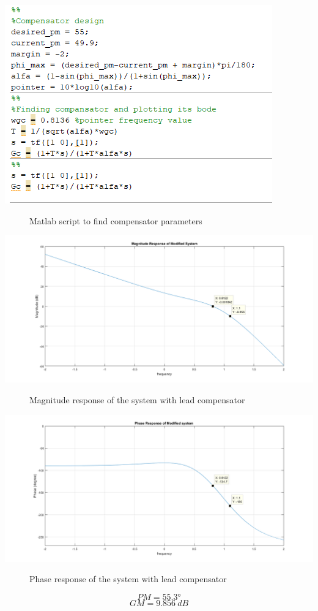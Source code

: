 \documentclass[11pt]{report}
\begin{document}
\includegraphics[scale=0.70, center]{code}
\begin{figure}[H]
\caption{Matlab script to find compensator parameters}
\label{fig:zero}
\end{figure}

\includegraphics[scale=0.40, center]{modified_magnitude}
\begin{figure}[H]
\caption{Magnitude response of the system with lead compensator}
\label{fig:zero}
\end{figure}

\includegraphics[scale=0.40, center]{modified_phase}
\begin{figure}[H]
\caption{Phase response of the system with lead compensator}
\label{fig:zero}
\end{figure}
\[PM=\ang{55.3}\]
\[GM=9.856 \> dB\]
\end{document}

